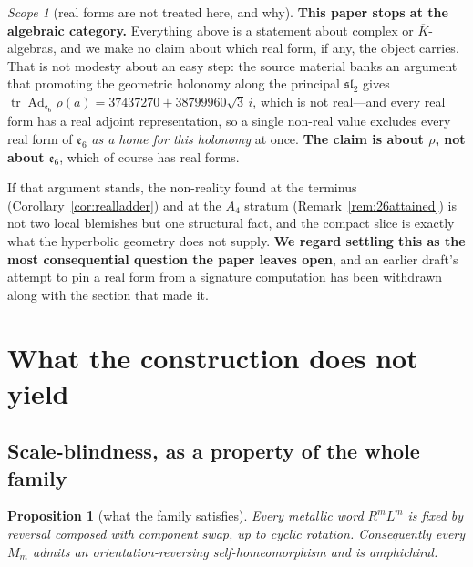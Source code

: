 \documentclass[11pt,reqno]{amsart}
\theoremstyle{plain}
\newtheorem{proposition}[theorem]{Proposition}
\theoremstyle{definition}
\theoremstyle{remark}
\newtheorem{scope}[theorem]{Scope}
\newcommand{\sll}{\mathfrak{sl}}
\newcommand{\ee}{\mathfrak{e}}
\begin{document}
\begin{scope}[real forms are not treated here, and why]\label{sc:norealform2}
\textbf{This paper stops at the algebraic category.} Everything above is a statement
about complex or $\overline K$-algebras, and we make no claim about which real form, if
any, the object carries. That is not modesty about an easy step: the source material
banks an argument that promoting the geometric holonomy along the principal $\sll_2$
gives $\operatorname{tr}\operatorname{Ad}_{\ee_6}\rho(a)=37437270+38799960\sqrt3\,i$,
which is not real---and every real form has a real adjoint representation, so a single
non-real value excludes every real form of $\ee_6$ \emph{as a home for this holonomy} at
once. \textbf{The claim is about $\rho$, not about $\ee_6$}, which of course has real
forms.

If that argument stands, the non-reality found at the terminus
(Corollary~\ref{cor:realladder}) and at the $A_4$ stratum (Remark~\ref{rem:26attained})
is not two local blemishes but one structural fact, and the compact slice is exactly
what the hyperbolic geometry does not supply. \textbf{We regard settling this as the most
consequential question the paper leaves open}, and an earlier draft's attempt to pin a
real form from a signature computation has been withdrawn along with the section that
made it.
\end{scope}

\section{What the construction does not yield}\label{sec:negatives}

\subsection{Scale-blindness, as a property of the whole family}

\begin{proposition}[what the family satisfies]\label{thm:amphi}
Every metallic word $R^mL^m$ is fixed by reversal composed with component swap, up to
cyclic rotation. Consequently every $M_m$ admits an orientation-reversing self-homeomorphism
and is amphichiral.
\end{proposition}
\end{document}
